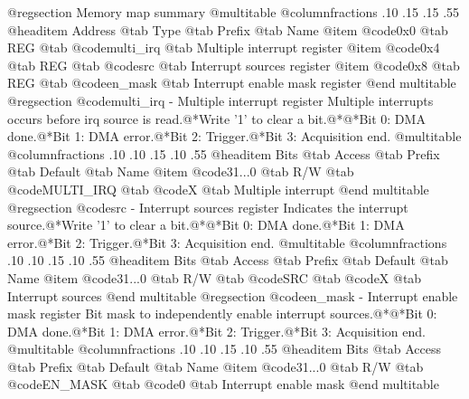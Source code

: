@regsection Memory map summary
@multitable  @columnfractions .10 .15 .15 .55
@headitem Address @tab Type @tab Prefix @tab Name
@item @code{0x0} @tab
REG @tab
@code{multi_irq} @tab
Multiple interrupt register
@item @code{0x4} @tab
REG @tab
@code{src} @tab
Interrupt sources register 
@item @code{0x8} @tab
REG @tab
@code{en_mask} @tab
Interrupt enable mask register
@end multitable 
@regsection @code{multi_irq} - Multiple interrupt register
Multiple interrupts occurs before irq source is read.@*Write '1' to clear a bit.@*@*Bit 0: DMA done.@*Bit 1: DMA error.@*Bit 2: Trigger.@*Bit 3: Acquisition end.
@multitable @columnfractions .10 .10 .15 .10 .55
@headitem Bits @tab Access @tab Prefix @tab Default @tab Name
@item @code{31...0}
@tab R/W @tab
@code{MULTI_IRQ}
@tab @code{X} @tab 
Multiple interrupt
@end multitable
@regsection @code{src} - Interrupt sources register 
Indicates the interrupt source.@*Write '1' to clear a bit.@*@*Bit 0: DMA done.@*Bit 1: DMA error.@*Bit 2: Trigger.@*Bit 3: Acquisition end.
@multitable @columnfractions .10 .10 .15 .10 .55
@headitem Bits @tab Access @tab Prefix @tab Default @tab Name
@item @code{31...0}
@tab R/W @tab
@code{SRC}
@tab @code{X} @tab 
Interrupt sources
@end multitable
@regsection @code{en_mask} - Interrupt enable mask register
Bit mask to independently enable interrupt sources.@*@*Bit 0: DMA done.@*Bit 1: DMA error.@*Bit 2: Trigger.@*Bit 3: Acquisition end.
@multitable @columnfractions .10 .10 .15 .10 .55
@headitem Bits @tab Access @tab Prefix @tab Default @tab Name
@item @code{31...0}
@tab R/W @tab
@code{EN_MASK}
@tab @code{0} @tab 
Interrupt enable mask
@end multitable
